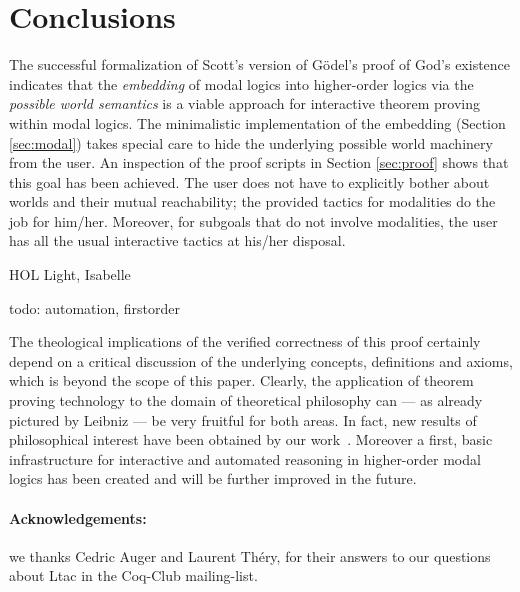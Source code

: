 \documentclass{llncs}
\begin{document}
\section{Conclusions}
\label{sec:conclusions}

The successful formalization of Scott's version of G\"odel's proof of
God's existence indicates that the \emph{embedding} of modal logics
into higher-order logics via the \emph{possible world semantics} is a
viable approach for interactive theorem proving within modal logics.
The minimalistic implementation of the embedding (Section
\ref{sec:modal}) takes special care to hide the underlying possible
world machinery from the user.  An inspection of the proof scripts in
Section \ref{sec:proof} shows that this goal has been achieved. The
user does not have to explicitly bother about worlds and their mutual
reachability; the provided tactics for modalities do the job for him/her.
Moreover, for subgoals that do not involve modalities, the user has all the
usual interactive tactics at his/her disposal.


HOL Light, Isabelle

todo: automation, firstorder


The theological implications of the verified correctness of this proof
certainly depend on a critical discussion of the underlying concepts,
definitions and axioms, which is beyond the scope of this paper. 
Clearly, the application of theorem proving technology to the domain of
theoretical philosophy can --- as already pictured by Leibniz ---
be very fruitful for both areas. In fact, new results of
philosophical interest have been obtained by our
work~\cite{arXiv}. Moreover a first, basic infrastructure for
interactive and automated reasoning in higher-order modal logics has
been created and will be further improved in the future.


\paragraph{Acknowledgements:} we thanks Cedric Auger and Laurent Th\'ery, for their answers to our questions about Ltac in the Coq-Club mailing-list. 
\end{document}
